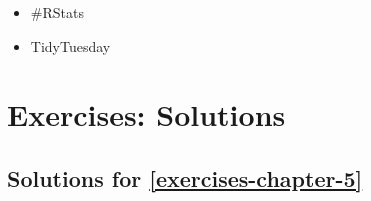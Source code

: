 \documentclass[
]{book}
\providecommand{\tightlist}{%
  \setlength{\itemsep}{0pt}\setlength{\parskip}{0pt}}
\begin{document}
\begin{itemize}
\tightlist
\item
  \#RStats
\item
  TidyTuesday
\end{itemize}

\hypertarget{exercises-solutions}{%
\chapter{Exercises: Solutions}\label{exercises-solutions}}

\hypertarget{exercises-solutions-5}{%
\section{Solutions for \ref{exercises-chapter-5}}\label{exercises-solutions-5}}
\end{document}
